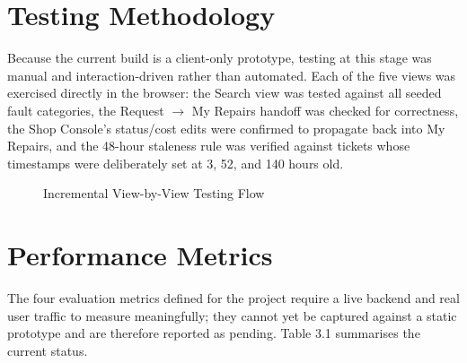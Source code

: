 \documentclass[11pt,a4paper]{report}
\begin{document}
\section{Testing Methodology}

Because the current build is a client-only prototype, testing at this stage was manual and interaction-driven rather than automated. Each of the five views was exercised directly in the browser: the Search view was tested against all seeded fault categories, the Request $\rightarrow$ My Repairs handoff was checked for correctness, the Shop Console's status/cost edits were confirmed to propagate back into My Repairs, and the 48-hour staleness rule was verified against tickets whose timestamps were deliberately set at 3, 52, and 140 hours old.

\begin{figure}[h!]
\centering
{}
\caption{Incremental View-by-View Testing Flow}
\end{figure}

\section{Performance Metrics}

The four evaluation metrics defined for the project require a live backend and real user traffic to measure meaningfully; they cannot yet be captured against a static prototype and are therefore reported as pending. Table 3.1 summarises the current status.
\end{document}
